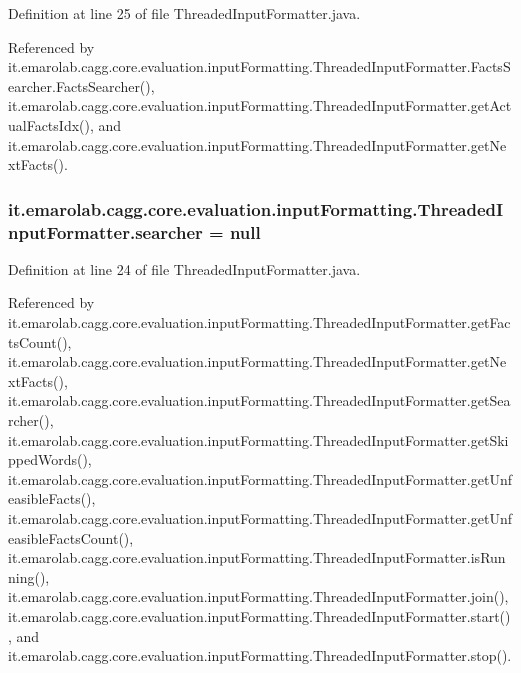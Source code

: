 Definition at line 25 of file Threaded\-Input\-Formatter.\-java.



Referenced by it.\-emarolab.\-cagg.\-core.\-evaluation.\-input\-Formatting.\-Threaded\-Input\-Formatter.\-Facts\-Searcher.\-Facts\-Searcher(), it.\-emarolab.\-cagg.\-core.\-evaluation.\-input\-Formatting.\-Threaded\-Input\-Formatter.\-get\-Actual\-Facts\-Idx(), and it.\-emarolab.\-cagg.\-core.\-evaluation.\-input\-Formatting.\-Threaded\-Input\-Formatter.\-get\-Next\-Facts().

\hypertarget{classit_1_1emarolab_1_1cagg_1_1core_1_1evaluation_1_1inputFormatting_1_1ThreadedInputFormatter_ae26a952b8df7153a31ae99c683427721}{
\subsubsection[{searcher}]{ it.\-emarolab.\-cagg.\-core.\-evaluation.\-input\-Formatting.\-Threaded\-Input\-Formatter.\-searcher = null\hspace{0.3cm}{\ttfamily [private]}}}\label{classit_1_1emarolab_1_1cagg_1_1core_1_1evaluation_1_1inputFormatting_1_1ThreadedInputFormatter_ae26a952b8df7153a31ae99c683427721}


Definition at line 24 of file Threaded\-Input\-Formatter.\-java.



Referenced by it.\-emarolab.\-cagg.\-core.\-evaluation.\-input\-Formatting.\-Threaded\-Input\-Formatter.\-get\-Facts\-Count(), it.\-emarolab.\-cagg.\-core.\-evaluation.\-input\-Formatting.\-Threaded\-Input\-Formatter.\-get\-Next\-Facts(), it.\-emarolab.\-cagg.\-core.\-evaluation.\-input\-Formatting.\-Threaded\-Input\-Formatter.\-get\-Searcher(), it.\-emarolab.\-cagg.\-core.\-evaluation.\-input\-Formatting.\-Threaded\-Input\-Formatter.\-get\-Skipped\-Words(), it.\-emarolab.\-cagg.\-core.\-evaluation.\-input\-Formatting.\-Threaded\-Input\-Formatter.\-get\-Unfeasible\-Facts(), it.\-emarolab.\-cagg.\-core.\-evaluation.\-input\-Formatting.\-Threaded\-Input\-Formatter.\-get\-Unfeasible\-Facts\-Count(), it.\-emarolab.\-cagg.\-core.\-evaluation.\-input\-Formatting.\-Threaded\-Input\-Formatter.\-is\-Running(), it.\-emarolab.\-cagg.\-core.\-evaluation.\-input\-Formatting.\-Threaded\-Input\-Formatter.\-join(), it.\-emarolab.\-cagg.\-core.\-evaluation.\-input\-Formatting.\-Threaded\-Input\-Formatter.\-start(), and it.\-emarolab.\-cagg.\-core.\-evaluation.\-input\-Formatting.\-Threaded\-Input\-Formatter.\-stop().



